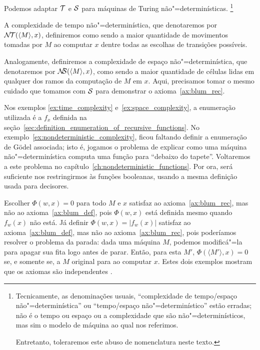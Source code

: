 \begin{example}
    \label{ex:nondeterministic_complexity}
    Podemos adaptar ${\mathcal{T}}$ e ${\mathcal{S}}$
    para máquinas de Turing não"=determinísticas.%
    \footnote{
        Tecnicamente,
        as denominações usuais,
        ``complexidade de tempo/espaço não"=determinística''
        ou ``tempo/espaço não"=determinístico''
        estão erradas;
        não é o tempo ou espaço ou a complexidade que são não"=determinísticos,
        mas sim o modelo de máquina ao qual nos referimos.

        Entretanto, toleraremos este abuso de nomenclatura neste texto.
    }

    A complexidade de tempo não"=determinística,
    que denotaremos por ${\mathcal{N\!T}}(\langle M \rangle, x)$,
    definiremos como sendo a maior quantidade de movimentos
    tomadas por $M$ ao computar $x$
    dentre todas as escolhas de transições possíveis.

    Analogamente,
    definiremos a complexidade de espaço não"=determinística,
    que denotaremos por ${\mathcal{N\!\!S}}(\langle M \rangle, x)$,
    como sendo a maior quantidade de células lidas
    em qualquer dos ramos da computação de $M$ em $x$.
    Aqui, precisamos tomar o mesmo cuidado que tomamos
    com ${\mathcal{S}}$ para demonstrar o axioma~\ref{ax:blum_rec}.
\end{example}

Nos exemplos \ref{ex:time_complexity} e~\ref{ex:space_complexity},
a enumeração utilizada é a $f_x$
definida na seção~\ref{sec:definition_enumeration_of_recursive_functions}.
No exemplo~\ref{ex:nondeterministic_complexity},
ficou faltando definir a enumeração de Gödel associada;
isto é, jogamos o problema de
explicar como uma máquina não"=determinística computa uma função
para ``debaixo do tapete''.
Voltaremos a este problema no capítulo~\ref{ch:nondeterministic_functions}.
Por ora,
será suficiente nos restringirmos às funções booleanas,
usando a mesma definição usada para decisores.

\begin{example}
    Escolher $\Phi(w, x) = 0$ para todo $M$ e $x$
    satisfaz ao axioma~\ref{ax:blum_rec},
    mas não ao axioma~\ref{ax:blum_def},
    pois $\Phi(w, x)$ está definida mesmo quando $f_w(x)$ não está.
    Já definir $\Phi(w, x) = |f_w(x)|$
    satisfaz ao axioma~\ref{ax:blum_def},
    mas não ao axioma~\ref{ax:blum_rec},
    pois poderíamos resolver o problema da parada:
    dada uma máquina $M$, podemos modificá"=la
    para apagar sua fita logo antes de parar.
    Então, para esta $M'$,
    $\Phi(\langle M' \rangle, x) = 0$ se, e somente se,
    a $M$ original para ao computar $x$.
    Estes dois exemplos mostram que os axiomas são independentes
    \cite[p.~324]{Blum1967}.
\end{example}

